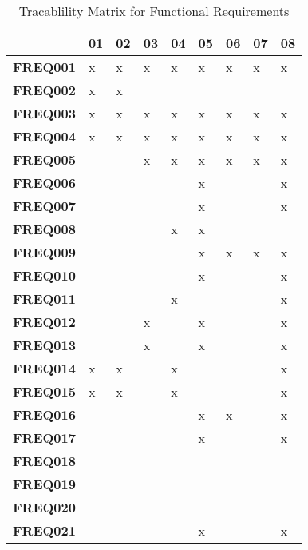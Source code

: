 \begin{flushleft}
\begin{table}[H]    
    \begin{tabular}{|p{2.5cm}|p{0.5cm}|p{0.5cm}|p{0.5cm}|p{0.5cm}|p{0.5cm}|p{0.5cm}|p{0.5cm}|p{0.5cm}|} 
        \hline & \textbf{01} & \textbf{02} & \textbf{03} & \textbf{04} & \textbf{05} & \textbf{06} & \textbf{07} & \textbf{08} \\ \hline
        \textbf{FREQ001} & x& x& x& x& x& x& x& x\\ \hline
        \textbf{FREQ002} & x& x&  &  &  &  &  &  \\ \hline
        \textbf{FREQ003} & x& x& x& x& x& x& x& x\\ \hline
        \textbf{FREQ004} & x& x& x& x& x& x& x& x\\ \hline
        \textbf{FREQ005} &  &  & x& x& x& x& x& x\\ \hline
        \textbf{FREQ006} &  &  &  &  & x&  &  & x\\ \hline
        \textbf{FREQ007} &  &  &  &  & x&  &  & x\\ \hline
        \textbf{FREQ008} &  &  &  & x& x&  &  &  \\ \hline
        \textbf{FREQ009} &  &  &  &  & x& x& x& x\\ \hline
        \textbf{FREQ010} &  &  &  &  & x&  &  & x\\ \hline
        \textbf{FREQ011} &  &  &  & x&  &  &  & x\\ \hline
        \textbf{FREQ012} &  &  & x&  & x&  &  & x\\ \hline
        \textbf{FREQ013} &  &  & x&  & x&  &  & x\\ \hline
		\textbf{FREQ014} & x& x&  & x&  &  &  & x\\ \hline
		\textbf{FREQ015} & x& x&  & x&  &  &  & x\\ \hline
        \textbf{FREQ016} &  &  &  &  & x& x&  & x\\ \hline
        \textbf{FREQ017} &  &  &  &  & x&  &  & x\\ \hline
        \textbf{FREQ018} &  &  &  &  &  &  &  &  \\ \hline
        \textbf{FREQ019} &  &  &  &  &  &  &  &  \\ \hline
        \textbf{FREQ020} &  &  &  &  &  &  &  &  \\ \hline
        \textbf{FREQ021} &  &  &  &  & x&  &  & x\\ \hline
        
    \end{tabular}
    \caption{Tracablility Matrix for Functional Requirements}
\end{table}

\end{flushleft}
